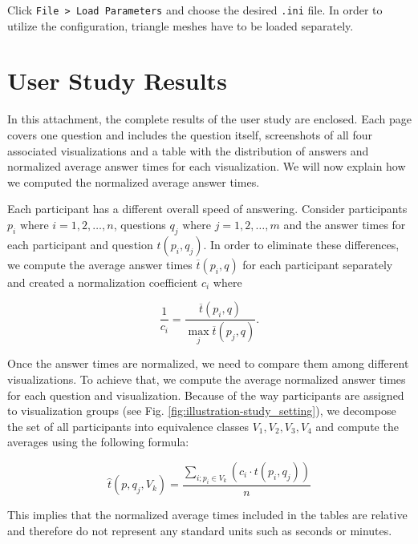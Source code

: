 Click \verb+File > Load Parameters+ and choose the desired \verb+.ini+ file. In order to utilize the configuration, triangle meshes have to be loaded separately.

\section{User Study Results}
\label{attch:complete_study_results}

In this attachment, the complete results of the user study are enclosed. Each page covers one question and includes the question itself, screenshots of all four associated visualizations and a table with the distribution of answers and normalized average answer times for each visualization. We will now explain how we computed the normalized average answer times.

Each participant has a different overall speed of answering. Consider participants \(p_i \text{ where } i = 1, 2, \dotsc, n\), questions \(q_j \text{ where } j = 1, 2, \dotsc, m\) and the answer times for each participant and question \(t(p_i,q_j)\). In order to eliminate these differences, we compute the average answer times \(\overline{t}(p_i,q)\) for each participant separately and created a normalization coefficient \(c_i\) where

\[\frac{1}{c_i} = \frac{\overline{t}(p_i,q)}{{\max_{j} \overline{t}(p_j,q)}}.\] 

Once the answer times are normalized, we need to compare them among different visualizations. To achieve that, we compute the average normalized answer times for each question and visualization. Because of the way participants are assigned to visualization groups (see Fig. \ref{fig:illustration-study_setting}), we decompose the set of all participants into equivalence classes \(V_1,V_2,V_3,V_4\) and compute the averages using the following formula:

\[\widehat{t}(p,q_j,V_k) = \frac{\sum_{i; p_i \in V_k}^{}(c_i \cdot t(p_i,q_j))}{n}\]

This implies that the normalized average times included in the tables are relative and therefore do not represent any standard units such as seconds or minutes.


